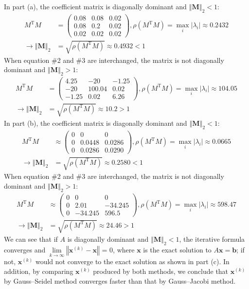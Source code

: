 \documentclass[10pt]{report}
\newcommand{\abs}[1] {\left| #1 \right|}
\newcommand{\norm}[2][\infty] {\left\Vert \mathbf{#2} \right\Vert_#1}
\begin{document}
\begin{enumerate}
\begin{enumerate}
		In part (a), the coefficient matrix is diagonally dominant and $\norm[2]{M} < 1$:
		\begin{align*}
		M^\mathrm{T}M &= \begin{pmatrix}
		0.08 & 0.08 & 0.02\\
		0.08 & 0.2 & 0.02\\
		0.02 & 0.02 & 0.02
		\end{pmatrix}, 
		\rho(M^\mathrm{T}M) = \max_i{\abs{\lambda_i}} \approx 0.2432\\
		\to \norm[2]{M} &= \sqrt{\rho(M^\mathrm{T}M)} \approx 0.4932 < 1
		\end{align*}
		When equation \#2 and \#3 are interchanged, the matrix is not diagonally dominant and $\norm[2]{M} > 1$:
		\begin{align*}
		M^\mathrm{T}M &= \begin{pmatrix}
		4.25 & -20 & -1.25\\
		-20 & 100.04 & 0.02\\
		-1.25 & 0.02 & 6.26
		\end{pmatrix}, 
		\rho(M^\mathrm{T}M) = \max_i{\abs{\lambda_i}} \approx 104.05\\
		\to \norm[2]{M} &= \sqrt{\rho(M^\mathrm{T}M)} \approx 10.2 > 1
		\end{align*}
		In part (b), the coefficient matrix is diagonally dominant and $\norm[2]{M} < 1$:
		\begin{align*}
		M^\mathrm{T}M &\approx \begin{pmatrix}
		0 & 0 & 0\\
		0 & 0.0448 & 0.0286\\
		0 & 0.0286 & 0.0290
		\end{pmatrix}, 
		\rho(M^\mathrm{T}M) = \max_i{\abs{\lambda_i}} \approx 0.0665\\
		\to \norm[2]{M} &= \sqrt{\rho(M^\mathrm{T}M)} \approx 0.2580 < 1
		\end{align*}
		When equation \#2 and \#3 are interchanged, the matrix is not diagonally dominant and $\norm[2]{M} > 1$:
		\begin{align*}
		M^\mathrm{T}M &\approx \begin{pmatrix}
		0 & 0 & 0\\
		0 & 2.01 & -34.245\\
		0 & -34.245 & 596.5
		\end{pmatrix}, 
		\rho(M^\mathrm{T}M) = \max_i{\abs{\lambda_i}} \approx 598.47\\
		\to \norm[2]{M} &= \sqrt{\rho(M^\mathrm{T}M)} \approx 24.46 > 1
		\end{align*}
		We can see that if $A$ is diagonally dominant and $\norm[2]{M} < 1$, the iterative formula converges and $\lim\limits_{k\to \infty} \left\Vert \mathbf{x}^{(k)} - \mathbf{x} \right\Vert$ = 0, where $\mathbf{x}$ is the exact solution to $A\mathbf{x} = \mathbf{b}$; if not, $\mathbf{x}^{(k)}$ would not converge to the exact solution as shown in part (c). In addition, by comparing $\mathbf{x}^{(k)}$ produced by both methods, we conclude that $\mathbf{x}^{(k)}$ by Gauss--Seidel method converges faster than that by Gauss--Jacobi method.
		

\end{enumerate}
\end{enumerate}
\end{document}
